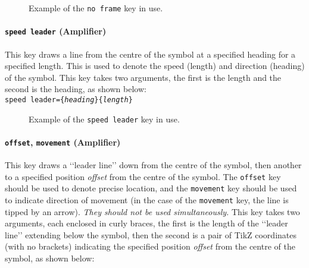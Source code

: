 \documentclass[a4paper, titlepage]{article}
\begin{document}
\begin{figure}[H]
\centering
{}
\caption{Example of the \texttt{no frame} key in use.}
\end{figure}

\paragraph{\texttt{speed leader} (Amplifier)}

This key draws a line from the centre of the symbol at a specified heading for a specified length. This is used to denote the speed (length) and direction (heading) of the symbol. This key takes two arguments, the first is the length and the second is the heading, as shown below:\\

\texttt{speed leader=\{\textit{heading}\}\{\textit{length}\}}

\begin{figure}[H]
\centering
{}
\caption{Example of the \texttt{speed leader} key in use.}
\end{figure}

\paragraph{\texttt{offset}, \texttt{movement} (Amplifier)}

This key draws a \lq\lq{}leader line\rq\rq{} down from the centre of the symbol, then another to a specified position \textit{offset} from the centre of the symbol. The \texttt{offset} key should be used to denote precise location, and the \texttt{movement} key should be used to indicate direction of movement (in the case of the \texttt{movement} key, the line is tipped by an arrow). \textit{They should not be used simultaneously.} This key takes two arguments, each enclosed in curly braces, the first is the length of the \lq\lq{}leader line\rq\rq{} extending below the symbol, then the second is a pair of TikZ coordinates (with no brackets) indicating the specified position \textit{offset} from the centre of the symbol, as shown below:\\
\end{document}

